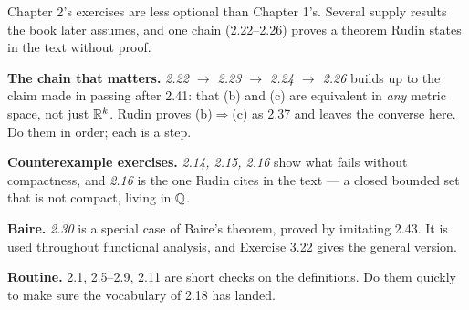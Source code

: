 
\begin{roadmap}
Chapter 2's exercises are less optional than Chapter 1's. Several supply
results the book later assumes, and one chain (2.22--2.26) proves a theorem
Rudin states in the text without proof.

\medskip
\raggedright
\textbf{The chain that matters.} \emph{2.22 $\to$ 2.23 $\to$ 2.24 $\to$ 2.26}
builds up to the claim made in passing after 2.41: that (b) and (c) are
equivalent in \emph{any} metric space, not just $\mathbb{R}^k$. Rudin proves
(b)$\Rightarrow$(c) as 2.37 and leaves the converse here. Do them in order;
each is a step.

\smallskip
\textbf{Counterexample exercises.} \emph{2.14, 2.15, 2.16} show what fails
without compactness, and \emph{2.16} is the one Rudin cites in the text --- a
closed bounded set that is not compact, living in $\mathbb{Q}$.

\smallskip
\textbf{Baire.} \emph{2.30} is a special case of Baire's theorem, proved by
imitating 2.43. It is used throughout functional analysis, and Exercise 3.22
gives the general version.

\smallskip
\textbf{Routine.} 2.1, 2.5--2.9, 2.11 are short checks on the definitions. Do
them quickly to make sure the vocabulary of 2.18 has landed.
\end{roadmap}


